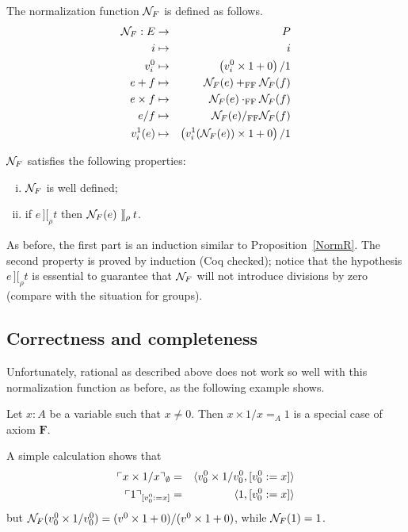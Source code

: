 \documentclass[numreferences]{kluwer}
\newcommand{\intII}{\,]\![}
\newcommand{\intrel}{\mathbin{\intII_{\rho}}}
\newcommand{\NF}{\ensuremath{{\cal N}_{F}}}
\newcommand{\tacticname}[1]{\textsf{#1}}
\newcommand{\rational}{\tacticname{rational}}
\newcommand{\axiom}[1]{\ensuremath{\mathbf{#1}}}
\newcommand{\mlfn}[2]{\ensuremath\ulcorner{#1}\urcorner_{#2}}
\newcommand{\plusFF}{\ensuremath{+_{\mathrm{FF}}}}
\newcommand{\multFF}{\ensuremath{\cdot_{\mathrm{FF}}}}
\newcommand{\divFF}{\ensuremath{/_{\mathrm{FF}}}}
\begin{document}
\begin{article}
\begin{definition}\label{defn:NormF}
The normalization function $\NF$ is defined as follows.
\begin{eqnarray*}
\NF : E & \to & P \\
 i & \mapsto & i \\
 v^0_i & \mapsto & \left(v^0_i\times 1+0\right)/1 \\
 e+f & \mapsto & \NF(e)\plusFF\NF(f) \\
 e\times f& \mapsto & \NF(e)\multFF\NF(f) \\
 e/f& \mapsto & \NF(e)\divFF\NF(f) \\
 v^1_i(e) & \mapsto & \left(v^1_i(\NF(e))\times 1+0\right)/1
\end{eqnarray*}
\end{definition}
\begin{proposition}\label{NormF} {\NF} satisfies the following properties:
\begin{enumerate}[(i)]
\item {\NF} is well defined;
\item\label{NFpresint} if $e\intrel t$ then $\NF(e)\intrel t$.
\end{enumerate}
\end{proposition}
\begin{pf}
As before, the first part is an induction similar to
Proposition~\ref{NormR}.
The second property is proved by induction (Coq checked); notice that the
hypothesis $e\intrel t$ is essential to guarantee that {\NF} will not
introduce divisions by zero (compare with the situation for groups).
\end{pf}

\subsection{Correctness and completeness}

Unfortunately, {\rational} as described above does not work so well
with this normalization function as before, as the following 
example shows.

\begin{example} Let $x:A$ be a variable such that $x\neq 0$.
Then $x\times 1/x =_A1$ is a special case of axiom \axiom{F}.

A simple calculation shows that
\begin{eqnarray*}
\mlfn{x\times 1/x}{\emptyset} & = &
  \langle v^0_0\times 1/v^0_0,[v^0_0:=x]\rangle \\
\mlfn{1}{[v^0_0:=x]} & = &
  \langle 1,[v^0_0:=x]\rangle
\end{eqnarray*}
but $\NF(v^0_0\times 1/v^0_0)=(v^0\times 1+0)/(v^0\times 1+0)$, while
$\NF(1)=1$.
\end{example}


\end{article}
\end{document}
